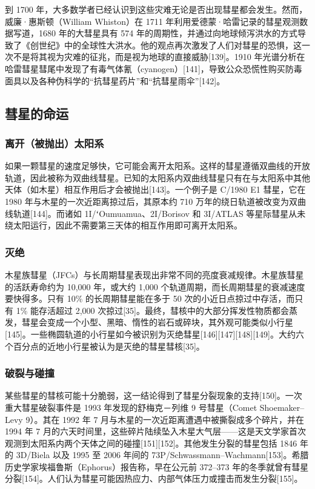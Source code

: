 到 1700 年，大多数学者已经认识到这些灾难无论是否出现彗星都会发生。然而，威廉·惠斯顿（William Whiston）在 1711 年利用爱德蒙·哈雷记录的彗星观测数据写道，1680 年的大彗星具有 574 年的周期性，并通过向地球倾泻洪水的方式导致了《创世纪》中的全球性大洪水。他的观点再次激发了人们对彗星的恐惧，这一次不是将其视为灾难的征兆，而是视为地球的直接威胁[139]。1910 年光谱分析在哈雷彗星彗尾中发现了有毒气体氰（cyanogen）[141]，导致公众恐慌性购买防毒面具以及各种伪科学的“抗彗星药片”和“抗彗星雨伞”[142]。
\subsection{彗星的命运}
\subsubsection{离开（被抛出）太阳系}
如果一颗彗星的速度足够快，它可能会离开太阳系。这样的彗星遵循双曲线的开放轨道，因此被称为双曲线彗星。已知的太阳系内双曲线彗星只有在与太阳系中其他天体（如木星）相互作用后才会被抛出[143]。一个例子是 C/1980 E1 彗星，它在 1980 年与木星的一次近距离掠过后，其原本约 710 万年的绕日轨道被改变为双曲线轨道[144]。而诸如 1I/ʻOumuamua、2I/Borisov 和 3I/ATLAS 等星际彗星从未绕太阳运行，因此不需要第三天体的相互作用即可离开太阳系。
\subsubsection{灭绝}
木星族彗星（JFCs）与长周期彗星表现出非常不同的亮度衰减规律。木星族彗星的活跃寿命约为 10,000 年，或大约 1,000 个轨道周期，而长周期彗星的衰减速度要快得多。只有 10\% 的长周期彗星能在多于 50 次的小近日点掠过中存活，而只有 1\% 能存活超过 2,000 次掠过[35]。最终，彗核中的大部分挥发性物质都会蒸发，彗星会变成一个小型、黑暗、惰性的岩石或碎块，其外观可能类似小行星[145]。一些椭圆轨道的小行星如今被识别为灭绝彗星[146][147][148][149]。大约六个百分点的近地小行星被认为是灭绝的彗星彗核[35]。
\subsubsection{破裂与碰撞}
某些彗星的彗核可能十分脆弱，这一结论得到了彗星分裂现象的支持[150]。一次重大彗星破裂事件是 1993 年发现的舒梅克－列维 9 号彗星（Comet Shoemaker–Levy 9）。其在 1992 年 7 月与木星的一次近距离遭遇中被撕裂成多个碎片，并在 1994 年 7 月的六天时间里，这些碎片陆续坠入木星大气层——这是天文学家首次观测到太阳系内两个天体之间的碰撞[151][152]。其他发生分裂的彗星包括 1846 年的 3D/Biela 以及 1995 至 2006 年间的 73P/Schwassmann–Wachmann[153]。希腊历史学家埃福鲁斯（Ephorus）报告称，早在公元前 372–373 年的冬季就曾有彗星分裂[154]。人们认为彗星可能因热应力、内部气体压力或撞击而发生分裂[155]。

